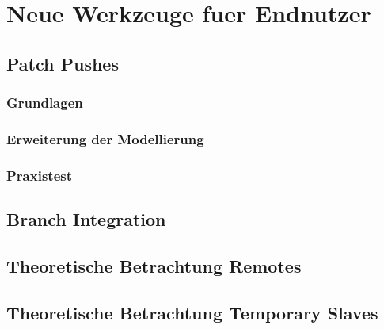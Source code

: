 \chapter{Neue Werkzeuge fuer Endnutzer}
\section{Patch Pushes}
\subsection{Grundlagen}
\subsection{Erweiterung der Modellierung}
\subsection{Praxistest}
\section{Branch Integration}
\section{Theoretische Betrachtung Remotes}
\section{Theoretische Betrachtung Temporary Slaves}

